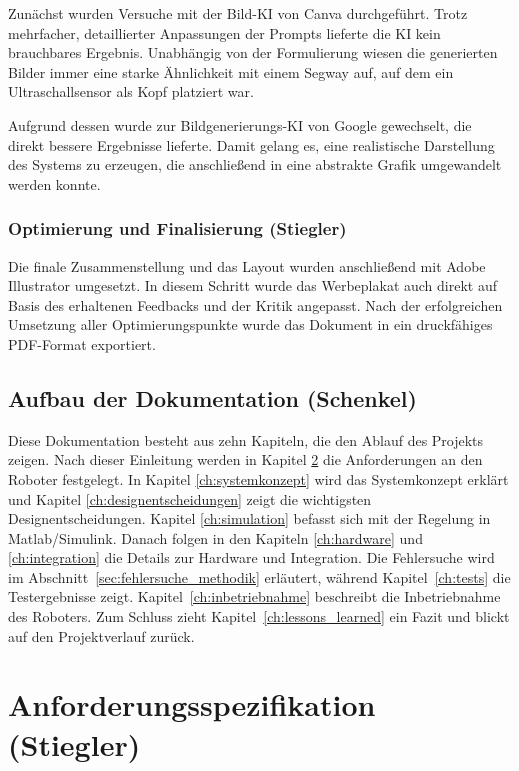 \documentclass[fontsize=12pt,
parskip=half,	%
department=FakM,  %
logostyle=flat,
twoside, %
DIV=15,BCOR=10mm, %
]{OTHRreprt}
\begin{document}
Zunächst wurden Versuche mit der Bild-KI von Canva durchgeführt. Trotz mehrfacher, detaillierter Anpassungen der Prompts lieferte die KI kein brauchbares Ergebnis. Unabhängig von der Formulierung wiesen die generierten Bilder immer eine starke Ähnlichkeit mit einem Segway auf, auf dem ein Ultraschallsensor als Kopf platziert war.

Aufgrund dessen wurde zur Bildgenerierungs-KI von Google gewechselt, die direkt bessere Ergebnisse lieferte. Damit gelang es, eine realistische Darstellung des Systems zu erzeugen, die anschließend in eine abstrakte Grafik umgewandelt werden konnte.

\subsection{Optimierung und Finalisierung (Stiegler)}
Die finale Zusammenstellung und das Layout wurden anschließend mit Adobe Illustrator umgesetzt. In diesem Schritt wurde das Werbeplakat auch direkt auf Basis des erhaltenen Feedbacks und der Kritik angepasst. Nach der erfolgreichen Umsetzung aller Optimierungspunkte wurde das Dokument in ein druckfähiges PDF-Format exportiert.


\section{Aufbau der Dokumentation (Schenkel)}
\label{sec:aufbau_dokumentation}
Diese Dokumentation besteht aus zehn Kapiteln, die den Ablauf des Projekts zeigen. Nach dieser Einleitung werden in Kapitel \ref{ch:anforderungen} die Anforderungen an den Roboter festgelegt. In Kapitel \ref{ch:systemkonzept} wird das Systemkonzept erklärt und Kapitel \ref{ch:designentscheidungen} zeigt die wichtigsten Designentscheidungen. Kapitel \ref{ch:simulation} befasst sich mit der Regelung in Matlab/Simulink. Danach folgen in den Kapiteln \ref{ch:hardware} und \ref{ch:integration} die Details zur Hardware und Integration. Die Fehlersuche wird im Abschnitt~\ref{sec:fehlersuche_methodik} erläutert, während Kapitel~\ref{ch:tests} die Testergebnisse zeigt. Kapitel~\ref{ch:inbetriebnahme} beschreibt die Inbetriebnahme des Roboters. Zum Schluss zieht Kapitel~\ref{ch:lessons_learned} ein Fazit und blickt auf den Projektverlauf zurück.


\chapter{Anforderungsspezifikation (Stiegler)}
\label{ch:anforderungen}
\end{document}
